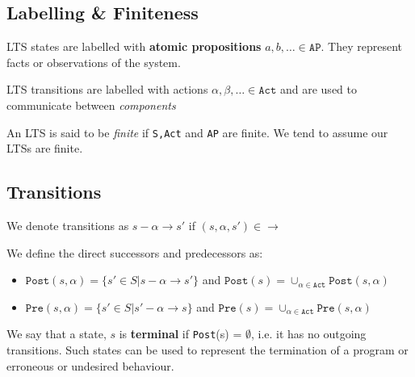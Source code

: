 \documentclass{article}
\begin{document}
\subsection{Labelling \& Finiteness}

LTS states are labelled with \textbf{atomic propositions} $a,b,\ldots \in \texttt{AP} $. They represent facts or observations of the system.

LTS transitions are labelled with actions $\alpha,\beta,\ldots \in \texttt{Act} $ and are used to communicate between \textit{components}

An LTS is said to be \textit{finite} if \texttt{S,Act} and \texttt{AP} are finite. We tend to assume our LTSs are finite.

\subsection{Transitions}

We denote transitions as $s -\alpha\rightarrow s\prime$ if $(s,\alpha,s\prime) \in \rightarrow$

We define the direct successors and predecessors as:
\begin{itemize}
  \item $\texttt{Post}(s,\alpha)= \{ s\prime \in S | s-\alpha\rightarrow s\prime \}  $ and $\texttt{Post}(s) = \cup_{\alpha\in \texttt{Act} } \texttt{Post}(s,\alpha)$
  \item $\texttt{Pre} (s,\alpha) = \{ s\prime \in S | s\prime -\alpha \rightarrow s \} $ and $\texttt{Pre}(s) = \cup_{\alpha\in \texttt{Act} } \texttt{Pre}(s,\alpha) $
\end{itemize}

We say that a state, $s$ is \textbf{terminal} if \texttt{Post}(s) = $\emptyset$, i.e. it has no outgoing transitions. Such states can be used to represent the termination of a program or erroneous or undesired behaviour.
\end{document}
